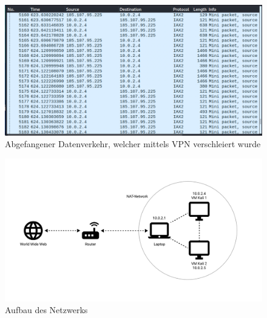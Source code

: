 \begin{figure}
    \includegraphics[width=\linewidth]{img/ws_vpn.png}
    \caption{Abgefangener Datenverkehr, welcher mittels VPN verschleiert wurde}
    \label{fig:ws_mitm_vpn}
\end{figure}
\begin{figure}
    \includegraphics[width=\linewidth]{img/network_fig.png}
    \caption{Aufbau des Netzwerks}
    \label{fig:network}
\end{figure}
